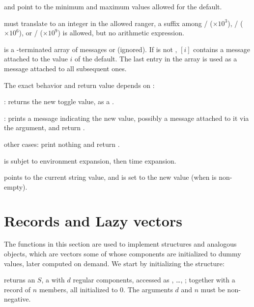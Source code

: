 \item {} and  point to the minimum and maximum values allowed
for the default.

\item {} must translate to an integer in the allowed ranger, a suffix
among
/ ($\times 10^3$),
/ ($\times 10^6$),
or
/ ($\times 10^9$) is allowed, but no arithmetic expression.

\item {} is a \kbd[NULL]-terminated array of messages or 
(ignored). If  is not , $[i]$ contains
a message attached to the value $i$ of the default. The last entry in the
 array is used as a message attached to all subsequent ones.

The exact behavior and return value depends on :

\item {}: returns the new toggle value, as a .

\item {}: prints a message indicating the new value,
possibly a message attached to it via the  argument, and return
.

\item other cases: print nothing and return .

\item {} is subjet to environment expansion, then time expansion.

\item {} points to the current string value, and is set to the new
value (when  is non-empty).

\section{Records and Lazy vectors}
The functions in this section are used to implement  structures and
analogous objects, which are vectors some of whose components are initialized
to dummy values, later computed on demand. We start by initializing the
structure:

 returns an  $S$, a 
with $d$ regular components, accessed as , \dots,
; together with a record of $n$ members, all initialized to
$0$. The arguments $d$ and $n$ must be non-negative.

